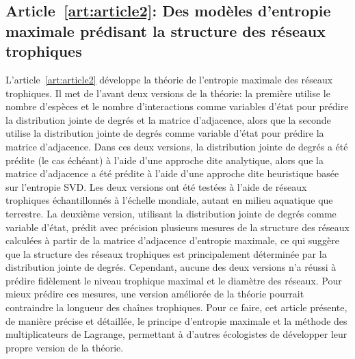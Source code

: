 \subsection{Article~\ref{art:article2}: Des modèles d'entropie maximale prédisant la structure des réseaux trophiques} 

L'article~\ref{art:article2} développe la théorie de l'entropie maximale des
réseaux trophiques. Il met de l'avant deux versions de la théorie: la première
utilise le nombre d'espèces et le nombre d'interactions comme variables d'état
pour prédire la distribution jointe de degrés et la matrice d'adjacence, alors
que la seconde utilise la distribution jointe de degrés comme variable d'état
pour prédire la matrice d'adjacence. Dans ces deux versions, la distribution
jointe de degrés a été prédite (le cas échéant) à l'aide d'une approche dite
analytique, alors que la matrice d'adjacence a été prédite à l'aide d'une
approche dite heuristique basée sur l'entropie SVD. Les deux versions ont été
testées à l'aide de réseaux trophiques échantillonnés à l'échelle mondiale,
autant en milieu aquatique que terrestre. La deuxième version, utilisant la
distribution jointe de degrés comme variable d'état, prédit avec précision
plusieurs mesures de la structure des réseaux calculées à partir de la matrice
d'adjacence d'entropie maximale, ce qui suggère que la structure des réseaux
trophiques est principalement déterminée par la distribution jointe de degrés.
Cependant, aucune des deux versions n'a réussi à prédire fidèlement le niveau
trophique maximal et le diamètre des réseaux. Pour mieux prédire ces mesures,
une version améliorée de la théorie pourrait contraindre la longueur des chaînes
trophiques. Pour ce faire, cet article présente, de manière précise et
détaillée, le principe d'entropie maximale et la méthode des multiplicateurs de
Lagrange, permettant à d'autres écologistes de développer leur propre version de
la théorie.

\endinput
